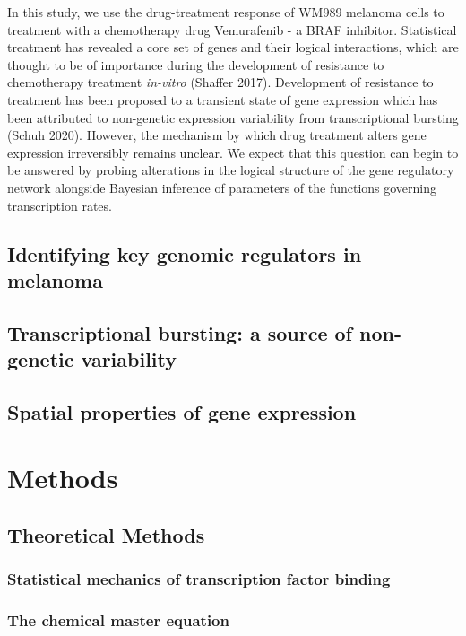 \documentclass{article}
\begin{document}
In this study, we use the drug-treatment response of WM989 melanoma cells to treatment with a chemotherapy drug Vemurafenib - a BRAF inhibitor. Statistical treatment has revealed a core set of genes and their logical interactions, which are thought to be of importance during the development of resistance to chemotherapy treatment \emph{in-vitro} (Shaffer 2017). Development of resistance to treatment has been proposed to a transient state of gene expression which has been attributed to non-genetic expression variability from transcriptional bursting (Schuh 2020). However, the mechanism by which drug treatment alters gene expression irreversibly remains unclear. We expect that this question can begin to be answered by probing alterations in the logical structure of the gene regulatory network alongside Bayesian inference of parameters of the functions governing transcription rates.

\subsection{Identifying key genomic regulators in melanoma}

\subsection{Transcriptional bursting: a source of non-genetic variability}

\subsection{Spatial properties of gene expression}

\section{Methods}

\subsection{Theoretical Methods}

\subsubsection{Statistical mechanics of transcription factor binding}

\subsubsection{The chemical master equation}
\end{document}
